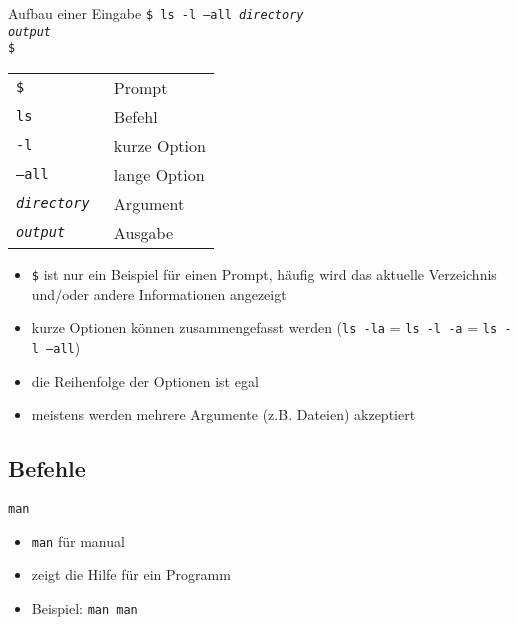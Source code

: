 \documentclass[t]{beamer}
\begin{document}
      \begin{frame}{Aufbau einer Eingabe}
        \texttt{\$ ls -l --all \textit{directory}\\
                \textit{output}\\
                \$}
        \begin{center}
          \begin{tabular}{>{\tt}l l}
            \toprule
            \$                 & Prompt       \\
            ls                 & Befehl       \\
            -l                 & kurze Option \\
            --all              & lange Option \\
            \textit{directory} & Argument     \\
            \textit{output}    & Ausgabe      \\
            \bottomrule
          \end{tabular}
        \end{center}
      \end{frame}

      \begin{frame}
        \begin{itemize}
          \item \texttt{\$} ist nur ein Beispiel für einen Prompt, häufig wird das aktuelle Verzeichnis und/oder andere Informationen angezeigt
          \item kurze Optionen können zusammengefasst werden (\texttt{ls~-la} = \texttt{ls -l -a} = \texttt{ls -l --all})
          \item die Reihenfolge der Optionen ist egal
          \item meistens werden mehrere Argumente (z.B. Dateien) akzeptiert
        \end{itemize}
      \end{frame}

    \subsection{Befehle}
      \begin{frame}{\texttt{man}}
        \begin{itemize}
          \item \texttt{man} für manual
          \item zeigt die Hilfe für ein Programm
          \item Beispiel: \texttt{man man}
        \end{itemize}
      \end{frame}
\end{document}
